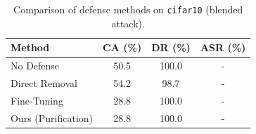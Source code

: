 \begin{table}[htbp]
\centering
\caption{Comparison of defense methods on \texttt{cifar10} (blended attack).}
\label{tab:results}
\begin{tabular}{lccc}
\toprule
Method & CA (\%) & DR (\%) & ASR (\%) \\
\midrule
  No Defense & 50.5 & 100.0 & - \\
  Direct Removal & 54.2 & 98.7 & - \\
  Fine-Tuning & 28.8 & 100.0 & - \\
  Ours (Purification) & 28.8 & 100.0 & - \\
\bottomrule
\end{tabular}
\end{table}